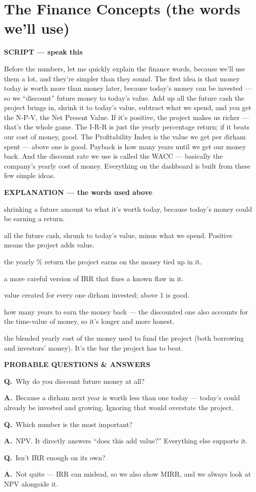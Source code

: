 \documentclass[12pt,a4paper]{article}
\newcommand{\block}[2]{\par\medskip\noindent\textcolor{#1}{\textbf{#2}}\par\nobreak\smallskip}
\newcommand{\SC}{\block{tvblue}{SCRIPT --- speak this}}
\newcommand{\EX}{\block{tvgreen}{EXPLANATION --- the words used above}}
\newcommand{\PQ}{\block{tvamber}{PROBABLE QUESTIONS \& ANSWERS}}
\newcommand{\qa}[2]{\par\noindent\textbf{Q.}~#1\par\noindent\textbf{A.}~#2\par\smallskip}
\newenvironment{terms}{\begin{description}[leftmargin=0pt,itemsep=2pt,font=\normalfont\bfseries]}{\end{description}}
\begin{document}
\section{The Finance Concepts (the words we'll use)}

\SC
Before the numbers, let me quickly explain the finance words, because we'll use them a lot, and
they're simpler than they sound. The first idea is that money today is worth more than money later,
because today's money can be invested --- so we ``discount'' future money to today's value. Add up all
the future cash the project brings in, shrink it to today's value, subtract what we spend, and you get
the N-P-V, the Net Present Value. If it's positive, the project makes us richer --- that's the whole
game. The I-R-R is just the yearly percentage return; if it beats our cost of money, good. The
Profitability Index is the value we get per dirham spent --- above one is good. Payback is how many
years until we get our money back. And the discount rate we use is called the WACC --- basically the
company's yearly cost of money. Everything on the dashboard is built from these few simple ideas.

\EX
\begin{terms}
  \item[Discounting / present value:] shrinking a future amount to what it's worth today, because
  today's money could be earning a return.
  \item[NPV (Net Present Value):] all the future cash, shrunk to today's value, minus what we spend.
  Positive means the project adds value.
  \item[IRR (Internal Rate of Return):] the yearly \% return the project earns on the money tied up
  in it.
  \item[MIRR:] a more careful version of IRR that fixes a known flaw in it.
  \item[PI (Profitability Index):] value created for every one dirham invested; above 1 is good.
  \item[Payback / discounted payback:] how many years to earn the money back --- the discounted one
  also accounts for the time-value of money, so it's longer and more honest.
  \item[WACC:] the blended yearly cost of the money used to fund the project (both borrowing and
  investors' money). It's the bar the project has to beat.
\end{terms}

\PQ
\qa{Why do you discount future money at all?}{Because a dirham next year is worth less than one today
--- today's could already be invested and growing. Ignoring that would overstate the project.}
\qa{Which number is the most important?}{NPV. It directly answers ``does this add value?'' Everything
else supports it.}
\qa{Isn't IRR enough on its own?}{Not quite --- IRR can mislead, so we also show MIRR, and we always
look at NPV alongside it.}
\end{document}
